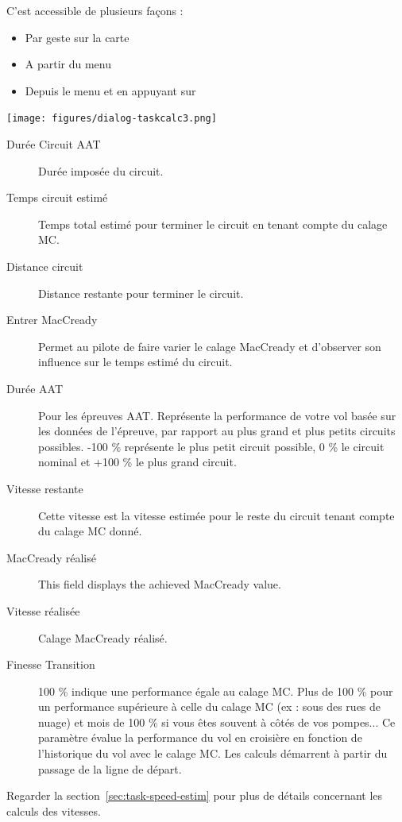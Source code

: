 C'est accessible de plusieurs façons : 
\begin{itemize}
\item Par geste sur la carte
\item A partir du menu 
\begin{quote}
\blink{}
\end{quote}
\item Depuis le menu \blink{} et en appuyant sur 
\end{itemize}

\begin{center}
\texttt{[image: figures/dialog-taskcalc3.png]}
\end{center}

\begin{description}
\item[Durée Circuit AAT]  Durée imposée du circuit.
\item[Temps circuit estimé]  Temps total estimé pour terminer le circuit en tenant compte du calage MC.
\item[Distance circuit]  Distance restante pour terminer le circuit.
\item[Entrer MacCready]  Permet au pilote de faire varier le calage MacCready et d'observer son influence sur le temps estimé du circuit.
\item[Durée AAT]  Pour les épreuves AAT. Représente la performance de votre vol basée sur les données de l'épreuve, par rapport au plus grand et plus petits circuits possibles. -100 \% représente le plus petit circuit possible, 0 \% le circuit nominal et +100 \% le plus grand circuit.
\item[Vitesse restante]  Cette vitesse est la vitesse estimée pour le reste du circuit tenant compte du calage MC donné.
\item[MacCready réalisé]  This field displays the achieved MacCready value.
\item[Vitesse réalisée]  Calage MacCready réalisé.
\item[Finesse Transition]  100 \% indique une performance égale au calage MC. Plus de 100 \% pour un performance supérieure à celle du calage MC (ex : sous des rues de nuage) et mois de 100 \% si vous êtes souvent à côtés de vos pompes... Ce paramètre évalue la performance du vol en croisière en fonction de l'historique du vol avec le calage MC. Les calculs démarrent à partir du passage de la ligne de départ.
\end{description}
Regarder la section~\ref{sec:task-speed-estim} pour plus de détails concernant les calculs des vitesses.


